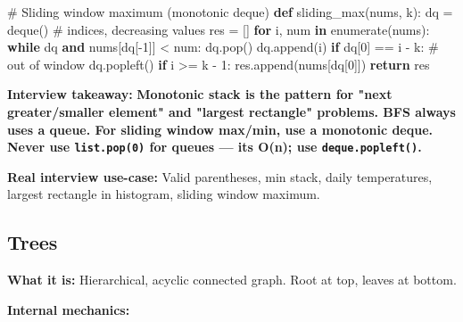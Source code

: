 \documentclass[11pt]{article}
\newenvironment{Shaded}{\begin{snugshade}}{\end{snugshade}}
\newcommand{\BuiltInTok}[1]{\textcolor[rgb]{0.50,0.55,0.55}{#1}}
\newcommand{\CommentTok}[1]{\textcolor[rgb]{0.48,0.49,0.49}{#1}}
\newcommand{\ControlFlowTok}[1]{\textcolor[rgb]{0.99,0.74,0.29}{\textbf{#1}}}
\newcommand{\DecValTok}[1]{\textcolor[rgb]{0.96,0.45,0.00}{#1}}
\newcommand{\KeywordTok}[1]{\textcolor[rgb]{0.81,0.81,0.76}{\textbf{#1}}}
\newcommand{\NormalTok}[1]{\textcolor[rgb]{0.81,0.81,0.76}{#1}}
\newcommand{\OperatorTok}[1]{\textcolor[rgb]{0.81,0.81,0.76}{#1}}
\begin{document}
\begin{Shaded}
\begin{Highlighting}[]
\CommentTok{\# Sliding window maximum (monotonic deque)}
\KeywordTok{def}\NormalTok{ sliding\_max(nums, k):}
\NormalTok{    dq }\OperatorTok{=}\NormalTok{ deque()   }\CommentTok{\# indices, decreasing values}
\NormalTok{    res }\OperatorTok{=}\NormalTok{ []}
    \ControlFlowTok{for}\NormalTok{ i, num }\KeywordTok{in} \BuiltInTok{enumerate}\NormalTok{(nums):}
        \ControlFlowTok{while}\NormalTok{ dq }\KeywordTok{and}\NormalTok{ nums[dq[}\OperatorTok{{-}}\DecValTok{1}\NormalTok{]] }\OperatorTok{\textless{}}\NormalTok{ num:}
\NormalTok{            dq.pop()}
\NormalTok{        dq.append(i)}
        \ControlFlowTok{if}\NormalTok{ dq[}\DecValTok{0}\NormalTok{] }\OperatorTok{==}\NormalTok{ i }\OperatorTok{{-}}\NormalTok{ k:  }\CommentTok{\# out of window}
\NormalTok{            dq.popleft()}
        \ControlFlowTok{if}\NormalTok{ i }\OperatorTok{\textgreater{}=}\NormalTok{ k }\OperatorTok{{-}} \DecValTok{1}\NormalTok{:}
\NormalTok{            res.append(nums[dq[}\DecValTok{0}\NormalTok{]])}
    \ControlFlowTok{return}\NormalTok{ res}
\end{Highlighting}
\end{Shaded}

\textbf{Interview takeaway:} \textbf{Monotonic stack is the pattern for "next greater/smaller element" and "largest rectangle" problems. BFS always uses a queue. For sliding window max/min, use a monotonic deque. Never use \texttt{list.pop(0)} for queues --- it\textquotesingle s O(n); use \texttt{deque.popleft()}.}

\textbf{Real interview use-case:} Valid parentheses, min stack, daily temperatures, largest rectangle in histogram, sliding window maximum.

\subsection{Trees}\label{trees}

\textbf{What it is:} Hierarchical, acyclic connected graph. Root at top, leaves at bottom.

\textbf{Internal mechanics:}

\setcodelang{}
\end{document}
